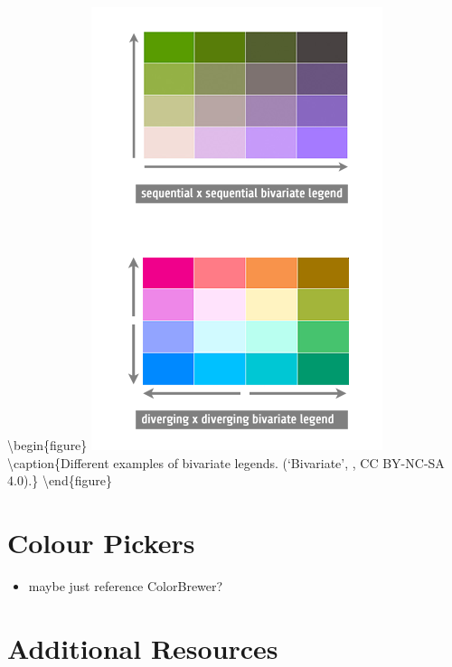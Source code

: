 \documentclass[
]{book}
\providecommand{\tightlist}{%
  \setlength{\itemsep}{0pt}\setlength{\parskip}{0pt}}
\begin{document}
\textbackslash begin\{figure\}
\includegraphics[width=0.8\linewidth]{images/17-bivariate} \textbackslash caption\{Different examples of bivariate legends. (`Bivariate', \citet{axis_maps_bivariate_2020}, CC BY-NC-SA 4.0).\}\label{fig:17-bivariate}
\textbackslash end\{figure\}

\hypertarget{colour-pickers}{%
\section{Colour Pickers}\label{colour-pickers}}

\begin{itemize}
\tightlist
\item
  maybe just reference ColorBrewer?
\end{itemize}

\hypertarget{additional-resources-1}{%
\section{Additional Resources}\label{additional-resources-1}}
\end{document}
